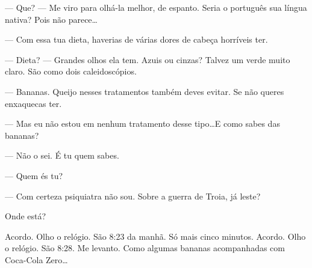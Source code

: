 --- Que? --- Me viro para olhá-la melhor, de espanto. Seria o português sua língua nativa? Pois não parece\ldots

--- Com essa tua dieta, haverias de várias dores de cabeça horríveis ter.

--- Dieta? --- Grandes olhos ela tem. Azuis ou cinzas? Talvez um verde muito claro. São como dois caleidoscópios.

--- Bananas. Queijo nesses tratamentos também deves evitar. Se não queres enxaquecas ter.

--- Mas eu não estou em nenhum tratamento desse tipo\ldots\linebreak E como sabes das bananas?

--- Não o sei. É tu quem sabes.

--- Quem és tu?

--- Com certeza psiquiatra não sou. Sobre a guerra de Troia, já leste?

Onde está?

Acordo. Olho o relógio. São 8:23 da manhã. Só mais cinco minutos. Acordo. Olho o relógio. São 8:28. Me levanto. Como algumas bananas acompanhadas com Coca-Cola Zero\ldots
